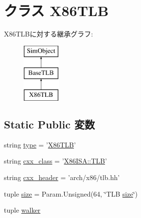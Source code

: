 \hypertarget{classX86TLB_1_1X86TLB}{
\section{クラス X86TLB}
\label{classX86TLB_1_1X86TLB}
}
X86TLBに対する継承グラフ:\begin{figure}[H]
\begin{center}
\leavevmode
\includegraphics[height=3cm]{classX86TLB_1_1X86TLB}
\end{center}
\end{figure}
\subsection*{Static Public 変数}
\begin{DoxyCompactItemize}
\item 
string \hyperlink{classX86TLB_1_1X86TLB_acce15679d830831b0bbe8ebc2a60b2ca}{type} = '\hyperlink{classX86TLB_1_1X86TLB}{X86TLB}'
\item 
string \hyperlink{classX86TLB_1_1X86TLB_a58cd55cd4023648e138237cfc0822ae3}{cxx\_\-class} = '\hyperlink{classX86ISA_1_1TLB}{X86ISA::TLB}'
\item 
string \hyperlink{classX86TLB_1_1X86TLB_a17da7064bc5c518791f0c891eff05fda}{cxx\_\-header} = 'arch/x86/tlb.hh'
\item 
tuple \hyperlink{classX86TLB_1_1X86TLB_a377e5da8df1f89c5468c8b8cd07eac89}{size} = Param.Unsigned(64, \char`\"{}TLB \hyperlink{classX86TLB_1_1X86TLB_a377e5da8df1f89c5468c8b8cd07eac89}{size}\char`\"{})
\item 
tuple \hyperlink{classX86TLB_1_1X86TLB_a38c6e2cd4db9b456da7637543e59ccbe}{walker}
\end{DoxyCompactItemize}


